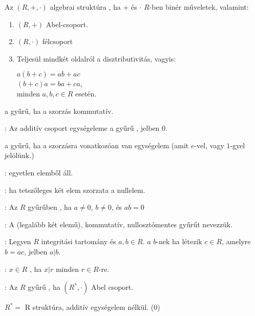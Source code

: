 \begin{frame}
  \begin{tcolorbox}[title={Def.: Gyűrűk}]
    Az $(R, +, {\cdot})$ algebrai struktúra , ha $+$ és $\cdot$ $R$-ben binér műveletek, valamint:\\
    \begin{enumerate}
      \item $(R, +)$ Abel-csoport.
      \item $(R, {\cdot})$ félcsoport
      \item Teljesül mindkét oldalról a disztributivitás, vagyis:\\
      \msmallskip
      
      $a(b + c) = ab + ac$\\
      $(b+ c)a = ba + ca$,\\
      minden $a, b, c \in R$ esetén.
    \end{enumerate}
    \mbigskip

     a gyűrű, ha a szorzás kommutatív.\\
    \mmedskip

    : Az additív csoport egységeleme a gyűrű , jelben 0.\\
    \mmedskip

     a gyűrű, ha a szorzásra vonatkozóan van egységelem (amit $e$-vel, vagy $1$-gyel jelölünk.)\\
    \mmedskip

    : egyetlen elemből áll.\\
    \mmedskip

    : ha tetszőleges két elem szorzata a nullelem.\\
    \mmedskip

    : Az $R$ gyűrűben , ha $a \neq 0$, $b \neq 0$, és $ab = 0$\\
    \mmedskip

    : A (legalább két elemű), kommutatív, nullosztómentes gyűrűt  nevezzük.\\
    \mmedskip

    : Legyen $R$ integritási tartomány és $a, b \in R$. $a$  $b$-nek ha létezik $c \in R$, amelyre $b = ac$, jelben $a | b$.\\
    \mmedskip

    : $x \in R$ , ha $x | r$ minden $r \in R$-re.\\
    \mmedskip

    : Az $R$ gyűrű , ha $(R^*, {\cdot})$ Abel csoport.\\
    \msmallskip
    
    {\footnotesize $R^* =$ R struktúra, additív egységelem nélkül. (0)}
  \end{tcolorbox}
\end{frame}


